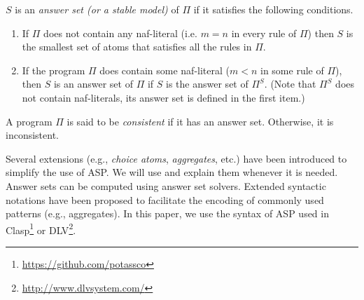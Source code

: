 \documentclass{article}
\def\naf{\: {not} \:}
\begin{document}
$S$ is an \emph{answer set (or a stable model)} of $\Pi$ if it
satisfies the following conditions.

\begin{enumerate}
\item  If $\Pi$ does not contain any naf-literal
(i.e. $m=n$ in every rule of $\Pi$) then $S$ is the smallest set
of atoms that satisfies all the rules in $\Pi$.

\item If the program $\Pi$ does contain some naf-literal
($m < n$ in some rule of $\Pi$), then $S$ is an answer set of
$\Pi$ if $S$ is the answer set of $\Pi^S$. (Note that $\Pi^S$ does
not contain naf-literals, its answer set is defined in the first
item.)
\end{enumerate}

A program $\Pi$ is said to be \emph{consistent} if it has an
answer set. Otherwise, it is inconsistent.

Several extensions (e.g.,  \emph{choice atoms}, \emph{aggregates}, etc.) have been introduced to simplify the use of ASP. We will use and explain them whenever it is needed. Answer sets can be computed using answer set solvers. Extended syntactic notations have been proposed to facilitate the encoding of commonly used patterns (e.g., aggregates). In this paper, we use the  syntax of ASP used in  {\sc Clasp}\footnote{
  \url{https://github.com/potassco}
} or DLV\footnote{\url{http://www.dlvsystem.com/}
}. 
\end{document}
